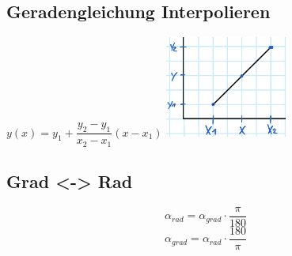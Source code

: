 


\begin{minipage}{13cm}
	
	
\end{minipage}
\begin{minipage}{5cm}
	
\end{minipage}
\begin{multicols}{2}
	
	\columnbreak
	
	
\end{multicols}
	
%	
\begin{minipage}{0.5\linewidth}
    \subsection{Geradengleichung Interpolieren}
    $ y(x)=y_1 + \dfrac{y_2 - y_1}{x_2 - x_1}(x-x_1) $\newline   
    \includegraphics[width=4cm]{idiotenseite/images/interpolieren}
\end{minipage}
\begin{minipage}{0.4\linewidth}
    \subsection{Grad <-> Rad}
    \[ \alpha_{rad}=\alpha_{grad}\cdot\dfrac{\pi}{180} \]
    \[ \alpha_{grad}=\alpha_{rad}\cdot\dfrac{180}{\pi} \]
\end{minipage}